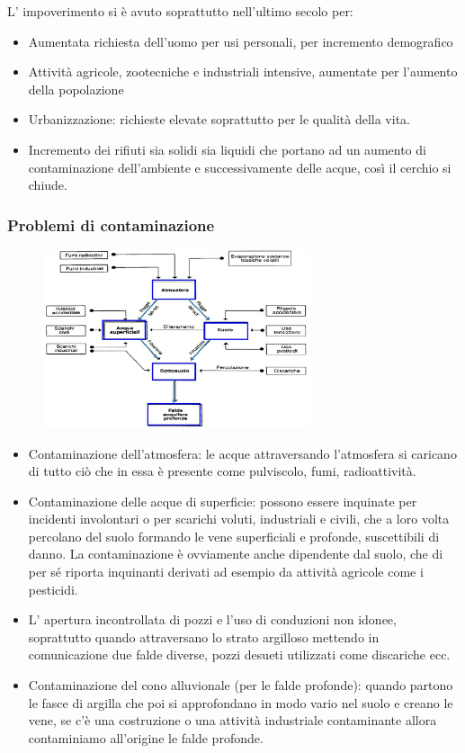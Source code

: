 L' impoverimento si è avuto soprattutto nell'ultimo secolo per:

\begin{itemize}
\item
  Aumentata richiesta dell'uomo per usi personali, per incremento
  demografico
\item
  Attività agricole, zootecniche e industriali intensive, aumentate per
  l'aumento della popolazione
\item
  Urbanizzazione: richieste elevate soprattutto per le qualità della
  vita.
\item
  Incremento dei rifiuti sia solidi sia liquidi che portano ad un
  aumento di contaminazione dell'ambiente e successivamente delle acque,
  così il cerchio si chiude.
\end{itemize}

\subsubsection{Problemi di contaminazione}

\begin{figure}[!ht]
\centering
	\includegraphics[width=0.7\textwidth]{24/image2.jpeg}
	\end{figure}

\begin{itemize}
\item
  Contaminazione dell'atmosfera: le acque attraversando l'atmosfera si
  caricano di tutto ciò che in essa è presente come pulviscolo, fumi,
  radioattività.
\item
  Contaminazione delle acque di superficie: possono essere inquinate per
  incidenti involontari o per scarichi voluti, industriali e civili, che
  a loro volta percolano del suolo formando le vene superficiali e
  profonde, suscettibili di danno. La contaminazione è ovviamente anche
  dipendente dal suolo, che di per sé riporta inquinanti derivati ad
  esempio da attività agricole come i pesticidi.
\item
  L' apertura incontrollata di pozzi e l'uso di conduzioni non idonee,
  soprattutto quando attraversano lo strato argilloso mettendo in
  comunicazione due falde diverse, pozzi desueti utilizzati come
  discariche ecc.
\item
  Contaminazione del cono alluvionale (per le falde profonde): quando
  partono le fasce di argilla che poi si approfondano in modo vario nel
  suolo e creano le vene, se c'è una costruzione o una attività
  industriale contaminante allora contaminiamo all'origine le falde
  profonde.
\end{itemize}

